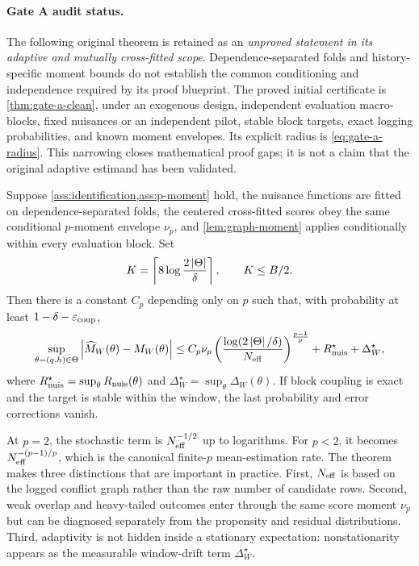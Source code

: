 \paragraph{Gate A audit status.}
The following original theorem is retained as an \emph{unproved statement in
its adaptive and mutually cross-fitted scope}. Dependence-separated folds and
history-specific moment bounds do not establish the common conditioning and
independence required by its proof blueprint. The proved initial certificate is
\cref{thm:gate-a-clean}, under an exogenous design, independent evaluation
macro-blocks, fixed nuisances or an independent pilot, stable block targets,
exact logging probabilities, and known moment envelopes. Its explicit radius
is \cref{eq:gate-a-radius}. This narrowing closes mathematical proof gaps;
it is not a claim that the original adaptive estimand has been validated.

\begin{theorem}
\label{thm:uniform-comet}
Suppose \cref{ass:identification,ass:p-moment} hold, the nuisance functions are fitted on dependence-separated folds, the centered cross-fitted scores obey the same conditional $p$-moment envelope $\nu_p$, and \cref{lem:graph-moment} applies conditionally within every evaluation block. Set
\begin{equation}
K=\left\lceil 8\log\frac{2\left|\Theta\right|}{\delta}\right\rceil,
\qquad K\le B/2.
\end{equation}
Then there is a constant $C_p$ depending only on $p$ such that, with probability at least $1-\delta-\varepsilon_{\mathrm{coup}}$,
\begin{equation}
\sup_{\theta=(q,h)\in\Theta}
\left|\widehat M_W(\theta)-M_W(\theta)\right|
\le
C_p\nu_p
\left(
\frac{\log(2\left|\Theta\right|/\delta)}{N_{\mathrm{eff}}}
\right)^{\frac{p-1}{p}}
+R_{\mathrm{nuis}}^{\star}+\Delta_W^{\star},
\label{eq:main-bound}
\end{equation}
where $R_{\mathrm{nuis}}^{\star}=\sup_{\theta}R_{\mathrm{nuis}}(\theta)$ and $\Delta_W^{\star}=\sup_{\theta}\Delta_W(\theta)$. If block coupling is exact and the target is stable within the window, the last probability and error corrections vanish.
\end{theorem}

At $p=2$, the stochastic term is $N_{\mathrm{eff}}^{-1/2}$ up to logarithms. For $p<2$, it becomes $N_{\mathrm{eff}}^{-(p-1)/p}$, which is the canonical finite-$p$ mean-estimation rate. The theorem makes three distinctions that are important in practice. First, $N_{\mathrm{eff}}$ is based on the logged conflict graph rather than the raw number of candidate rows. Second, weak overlap and heavy-tailed outcomes enter through the same score moment $\nu_p$ but can be diagnosed separately from the propensity and residual distributions. Third, adaptivity is not hidden inside a stationary expectation: nonstationarity appears as the measurable window-drift term $\Delta_W^{\star}$.

